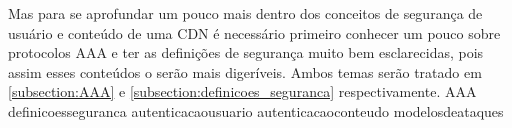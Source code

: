 \newline
Mas para se aprofundar um pouco mais dentro dos conceitos de seguran\c{c}a de usu\'ario e conte\'udo de uma CDN \'e necess\'ario primeiro conhecer um pouco sobre protocolos AAA e ter as defini\c{c}\~oes de seguran\c{c}a muito bem esclarecidas, pois assim esses conte\'udos o ser\~ao mais diger\'iveis. Ambos temas ser\~ao tratado em \ref{subsection:AAA} e \ref{subsection:definicoes_seguranca} respectivamente.
{AAA}
{definicoesseguranca}
{autenticacaousuario}
{autenticacaoconteudo}
{modelosdeataques}